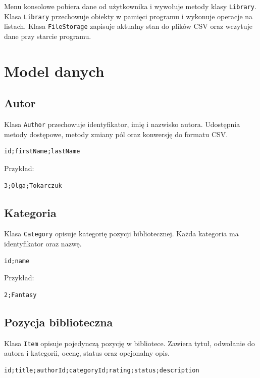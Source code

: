 \documentclass[12pt,a4paper]{article}
\begin{document}
Menu konsolowe pobiera dane od użytkownika i wywołuje metody klasy \texttt{Library}.
Klasa \texttt{Library} przechowuje obiekty w pamięci programu i wykonuje operacje
na listach. Klasa \texttt{FileStorage} zapisuje aktualny stan do plików CSV oraz
wczytuje dane przy starcie programu.

\section{Model danych}

\subsection{Autor}

Klasa \texttt{Author} przechowuje identyfikator, imię i nazwisko autora.
Udostępnia metody dostępowe, metody zmiany pól oraz konwersję do formatu CSV.

\begin{lstlisting}
id;firstName;lastName
\end{lstlisting}

Przykład:

\begin{lstlisting}
3;Olga;Tokarczuk
\end{lstlisting}

\subsection{Kategoria}

Klasa \texttt{Category} opisuje kategorię pozycji bibliotecznej. Każda kategoria
ma identyfikator oraz nazwę.

\begin{lstlisting}
id;name
\end{lstlisting}

Przykład:

\begin{lstlisting}
2;Fantasy
\end{lstlisting}

\subsection{Pozycja biblioteczna}

Klasa \texttt{Item} opisuje pojedynczą pozycję w bibliotece. Zawiera tytuł, odwołanie
do autora i kategorii, ocenę, status oraz opcjonalny opis.

\begin{lstlisting}
id;title;authorId;categoryId;rating;status;description
\end{lstlisting}
\end{document}
